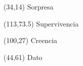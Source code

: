 \documentclass[shownotes,aspectratio=169]{beamer}
\begin{document}
\begin{frame}[plain]
\begin{textblock}{80}(34,14)
 \huge \textcolor{black!50}{Sorpresa}
\end{textblock}

\begin{textblock}{47}(113,73.5)
\centering \LARGE  \textcolor{black!5}{Supervivencia}
\end{textblock}

\begin{textblock}{80}(100,27)
\LARGE  \textcolor{black!10}{Creencia}
\end{textblock}

\begin{textblock}{80}(44,61)
\LARGE  \textcolor{black!15}{Dato}
\end{textblock}

{}
\end{frame}
 
\end{document}
